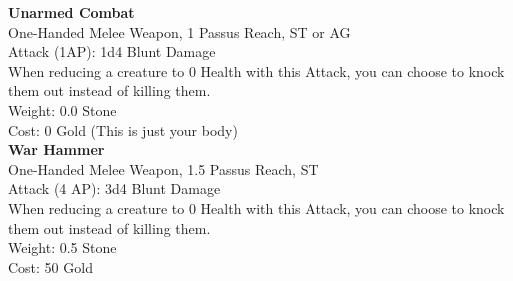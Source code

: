 \textbf{Unarmed Combat}\\
One-Handed Melee Weapon, 1 Passus Reach, ST or AG\\
Attack (1AP): 1d4 Blunt Damage\\
When reducing a creature to 0 Health with this Attack, you can choose to knock them out instead of killing them.\\
Weight: 0.0 Stone\\
Cost: 0 Gold (This is just your body)\\


\textbf{War Hammer}\\
One-Handed Melee Weapon, 1.5 Passus Reach, ST\\
Attack (4 AP): 3d4 Blunt Damage\\
When reducing a creature to 0 Health with this Attack, you can choose to knock them out instead of killing them.\\
Weight: 0.5 Stone\\
Cost: 50 Gold\\